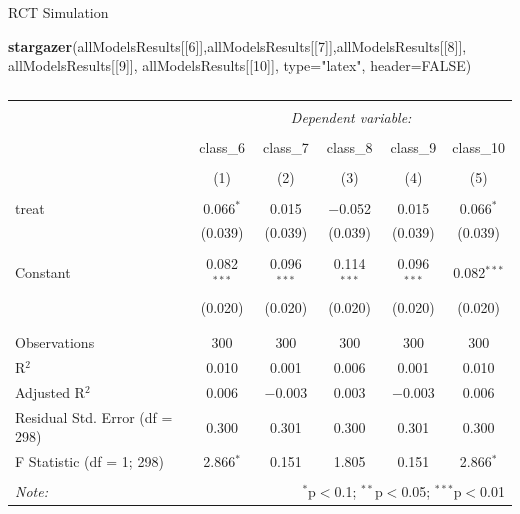 \documentclass[
  ignorenonframetext,
]{beamer}
\newenvironment{Shaded}{\begin{snugshade}}{\end{snugshade}}
\newcommand{\DataTypeTok}[1]{\textcolor[rgb]{0.13,0.29,0.53}{#1}}
\newcommand{\DecValTok}[1]{\textcolor[rgb]{0.00,0.00,0.81}{#1}}
\newcommand{\KeywordTok}[1]{\textcolor[rgb]{0.13,0.29,0.53}{\textbf{#1}}}
\newcommand{\NormalTok}[1]{#1}
\newcommand{\OtherTok}[1]{\textcolor[rgb]{0.56,0.35,0.01}{#1}}
\newcommand{\StringTok}[1]{\textcolor[rgb]{0.31,0.60,0.02}{#1}}
\begin{document}
\begin{frame}[fragile]{RCT Simulation}
\protect\hypertarget{rct-simulation-8}{}
\tiny

\begin{Shaded}
\begin{Highlighting}[]
\KeywordTok{stargazer}\NormalTok{(allModelsResults[[}\DecValTok{6}\NormalTok{]],allModelsResults[[}\DecValTok{7}\NormalTok{]],allModelsResults[[}\DecValTok{8}\NormalTok{]],}
\NormalTok{          allModelsResults[[}\DecValTok{9}\NormalTok{]], allModelsResults[[}\DecValTok{10}\NormalTok{]], }\DataTypeTok{type=}\StringTok{"latex"}\NormalTok{, }\DataTypeTok{header=}\OtherTok{FALSE}\NormalTok{)}
\end{Highlighting}
\end{Shaded}

\begin{table}[!htbp] \centering 
  \caption{} 
  \label{} 
\begin{tabular}{@{\extracolsep{5pt}}lccccc} 
\\[-1.8ex]\hline 
\hline \\[-1.8ex] 
 & \multicolumn{5}{c}{\textit{Dependent variable:}} \\ 
\cline{2-6} 
\\[-1.8ex] & class\_6 & class\_7 & class\_8 & class\_9 & class\_10 \\ 
\\[-1.8ex] & (1) & (2) & (3) & (4) & (5)\\ 
\hline \\[-1.8ex] 
 treat & 0.066$^{*}$ & 0.015 & $-$0.052 & 0.015 & 0.066$^{*}$ \\ 
  & (0.039) & (0.039) & (0.039) & (0.039) & (0.039) \\ 
  & & & & & \\ 
 Constant & 0.082$^{***}$ & 0.096$^{***}$ & 0.114$^{***}$ & 0.096$^{***}$ & 0.082$^{***}$ \\ 
  & (0.020) & (0.020) & (0.020) & (0.020) & (0.020) \\ 
  & & & & & \\ 
\hline \\[-1.8ex] 
Observations & 300 & 300 & 300 & 300 & 300 \\ 
R$^{2}$ & 0.010 & 0.001 & 0.006 & 0.001 & 0.010 \\ 
Adjusted R$^{2}$ & 0.006 & $-$0.003 & 0.003 & $-$0.003 & 0.006 \\ 
Residual Std. Error (df = 298) & 0.300 & 0.301 & 0.300 & 0.301 & 0.300 \\ 
F Statistic (df = 1; 298) & 2.866$^{*}$ & 0.151 & 1.805 & 0.151 & 2.866$^{*}$ \\ 
\hline 
\hline \\[-1.8ex] 
\textit{Note:}  & \multicolumn{5}{r}{$^{*}$p$<$0.1; $^{**}$p$<$0.05; $^{***}$p$<$0.01} \\ 
\end{tabular} 
\end{table}
\end{frame}
\end{document}
